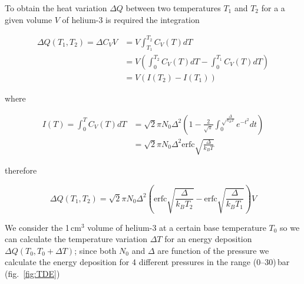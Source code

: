 \documentclass[a4paper,12pt]{article}
\begin{document}
To obtain the heat variation $\Delta Q$ between two temperatures $T_1$ and $T_2$ for a a given volume $V$ of helium-3 is required the integration

\begin{align}
\Delta Q (T_1,T_2) = \Delta C_V V & = V \int_{T_1}^{T_2} C_V(T)dT \\
                                  & = V \left( \int_{0}^{T_2} C_V(T)dT - \int_{0}^{T_1} C_V(T)dT \right)\\
                                  & = V \left( I(T_2) - I(T_1) \right)  
\end{align}

where

\begin{align}
I(T) = \int_{0}^{T} C_V(T)dT & = \sqrt{2} \pi N_0 \Delta^2 \left( 1 - \frac{2}{\sqrt{\pi}}\int_{0}^{\sqrt \frac{\Delta}{k_BT}} e^{-t^2} dt \right) \\ 
                             & =  \sqrt{2}\pi N_0\Delta^2 \mathrm{erfc} \sqrt{\frac{\Delta}{k_BT} } 
\end{align}

therefore

\begin{equation}
\Delta Q (T_1,T_2) = \sqrt{2}\pi N_0\Delta^2 \left( \mathrm{erfc}\sqrt{\frac{\Delta}{k_BT_2}} - \mathrm{erfc}\sqrt{\frac{\Delta}{k_BT_1}} \right)V
\end{equation}

We consider the 1\,cm$^3$ volume of helium-3 at a certain base temperature $T_0$ so we can calculate the temperature variation $\Delta T$ for an energy deposition $\Delta Q(T_0,T_0+\Delta T)$;
since both $N_0$ and $\Delta$ are function of the pressure we calculate the energy deposition for 4 different pressures in the range (0--30)\,bar (fig.~\ref{fig:TDE})
\end{document}
